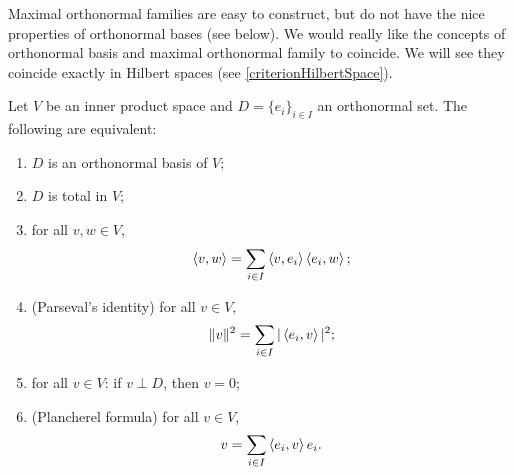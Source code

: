 Maximal orthonormal families are easy to construct, but do not have the nice properties of orthonormal bases (see below). We would really like the concepts of orthonormal basis and maximal orthonormal family to coincide. We will see they coincide exactly in Hilbert spaces (see \ref{criterionHilbertSpace}).

\begin{proposition} \label{totalONBParsevalEquivalence} \label{plancherel}
Let $V$ be an inner product space and $D = \{e_i\}_{i\in I}$ an orthonormal set. The following are equivalent:
\begin{enumerate}
\item $D$ is an orthonormal basis of $V$;
\item $D$ is total in $V$;
\item for all $v,w\in V$,
\[ \left\langle v,w \right\rangle = \sum_{i\in I}\left\langle v,e_i \right\rangle\left\langle e_i,w \right\rangle; \]
\item \textup{(Parseval's identity)} for all $v\in V$,
\[ \lVert v\rVert^2 = \sum_{i\in I}|\left\langle e_i,v \right\rangle|^2; \]
\item for all $v\in V$: if $v\perp D$, then $v=0$;
\item \textup{(Plancherel formula)} for all $v\in V$,
\[ v = \sum_{i\in I}\left\langle e_{i},v \right\rangle e_{i}. \]
\end{enumerate}
\end{proposition}

